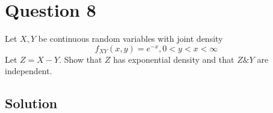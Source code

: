 \section*{Question 8}

Let \( X, Y \) be continuous random variables with joint density
\[
    f_{X Y}(x, y)=e^{-x}, 0<y<x<\infty
\]
Let \( Z=X-Y \).
Show that \( Z \) has exponential density and that \( Z \& Y \) are independent.

\subsection*{Solution}

